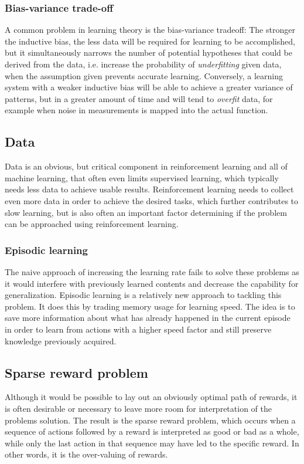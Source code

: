 \documentclass[12pt,a4]{article}
\begin{document}
\subsubsection{Bias-variance trade-off}
A common problem in learning theory is the bias-variance tradeoff: The stronger the inductive bias, the less data will be required for learning to be accomplished, but it simultaneously narrows the number of potential hypotheses that could be derived from the data, i.e. increase the probability of \emph{underfitting} given data, when the assumption given prevents accurate learning. Conversely, a learning system with a weaker inductive bias will be able to achieve a greater variance of patterns, but in a greater amount of time and will tend to \emph{overfit} data, for example when noise in measurements is mapped into the actual function. \citep{KrieselKNN} \citep{RLfastslow} \citep{roboticRL}


\subsection{Data}
Data is an obvious, but critical component in reinforcement learning and all of machine learning, that often even limits supervised learning, which typically needs less data to achieve usable results. Reinforcement learning needs to collect even more data in order to achieve the desired tasks, which further contributes to slow learning, but is also often an important factor determining if the problem can be approached using reinforcement learning. \citep{RLfastslow}


\subsubsection{Episodic learning}
The naive approach of increasing the learning rate fails to solve these problems as it would interfere with previously learned contents and decrease the capability for generalization. Episodic learning is a relatively new approach to tackling this problem. It does this by trading memory usage for learning speed. The idea is to save more information about what has already happened in the current episode in order to learn from actions with a higher speed factor and still preserve knowledge previously acquired.



\subsection{Sparse reward problem}
Although it would be possible to lay out an obviously optimal path of rewards, it is often desirable or necessary to leave more room for interpretation of the problems solution. The result is the sparse reward problem, which occurs when a sequence of actions followed by a reward is interpreted as good or bad as a whole, while only the last action in that sequence may have led to the specific reward. In other words, it is the over-valuing of rewards.
\end{document}
